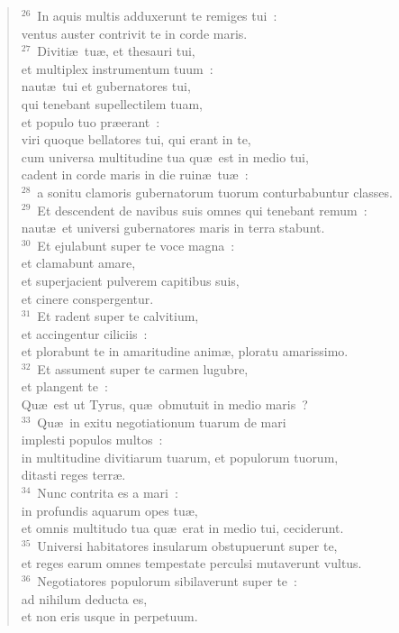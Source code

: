 \begin{flushleft}\begin{verse}${}^{26}$~In aquis multis adduxerunt te remiges tui~:\\ ventus auster contrivit te in corde maris.\\
${}^{27}$~Diviti\ae\ tu\ae , et thesauri tui,\\ et multiplex instrumentum tuum~:\\ naut\ae\ tui et gubernatores tui,\\ qui tenebant supellectilem tuam,\\ et populo tuo pr\ae erant~:\\ viri quoque bellatores tui, qui erant in te,\\ cum universa multitudine tua qu\ae\ est in medio tui,\\ cadent in corde maris in die ruin\ae\ tu\ae~:\\
${}^{28}$~a sonitu clamoris gubernatorum tuorum conturbabuntur classes.\\
${}^{29}$~Et descendent de navibus suis omnes qui tenebant remum~:\\ naut\ae\ et universi gubernatores maris in terra stabunt.\\
${}^{30}$~Et ejulabunt super te voce magna~:\\ et clamabunt amare,\\ et superjacient pulverem capitibus suis,\\ et cinere conspergentur.\\
${}^{31}$~Et radent super te calvitium,\\ et accingentur ciliciis~:\\ et plorabunt te in amaritudine anim\ae , ploratu amarissimo.\\
${}^{32}$~Et assument super te carmen lugubre,\\ et plangent te~:\\ Qu\ae\ est ut Tyrus, qu\ae\ obmutuit in medio maris~?\\
${}^{33}$~Qu\ae\ in exitu negotiationum tuarum de mari\\ implesti populos multos~:\\ in multitudine divitiarum tuarum, et populorum tuorum,\\ ditasti reges terr\ae .\\
${}^{34}$~Nunc contrita es a mari~:\\ in profundis aquarum opes tu\ae ,\\ et omnis multitudo tua qu\ae\ erat in medio tui, ceciderunt.\\
${}^{35}$~Universi habitatores insularum obstupuerunt super te,\\ et reges earum omnes tempestate perculsi mutaverunt vultus.\\
${}^{36}$~Negotiatores populorum sibilaverunt super te~:\\ ad nihilum deducta es,\\ et non eris usque in perpetuum.\end{verse}\end{flushleft}


